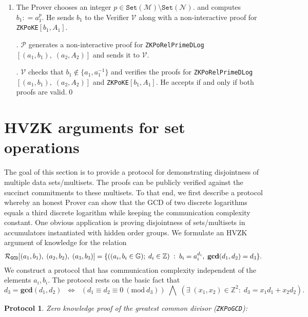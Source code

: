 \documentclass[11pt, lettersize, notitlepage, leqno, footskip=0.6cm]{article}
\newcommand{\bz}{\mathbb Z}
\newcommand{\ttt}{\texttt}
\newcommand{\sett}{\ttt{Set}}
\newcommand{\LRA}{\Longleftrightarrow}
\newcommand{\mc}{\mathcal}
\newcommand{\mb}{\mathbb}
\newcommand{\mbf}{\mathbf}
\newcommand{\mP}{\mc{P}}
\newcommand{\V}{\mc{V}}
\newcommand{\vs}{\vspace{-0.15cm}}
\newcommand{\noin}{\noindent}
\newcommand{\Mod}[1]{\ (\mathrm{mod}\ #1)}
\newcommand{\GCD}{\mbf{gcd}}
\newtheorem{Prot}[Thm]{Protocol}
\numberwithin{equation}{section}
\begin{document}
\begin{enumerate}[wide, labelwidth=!, labelindent=0pt] \vs \item The Prover chooses an integer $p\in \sett(\mc{M})\setminus \sett(\mc{N}).$ and computes $b_1: = a_1^p$. He sends $b_1$ to the Verifier $\V$ along with a non-interactive proof for \verb|ZKPoKE|$[b_1, A_1]$.

\noin 2. $\mP$ generates a non-interactive proof for \verb|ZKPoRelPrimeDLog|$[(a_1, b_1),\; (a_2, A_2)]$ and sends it to $\V$.

\noin 3. $\V$ checks that $b_1\notin \{ a_1, a_1^{-1}\}$ and verifies the proofs for \verb|ZKPoRelPrimeDLog|$[(a_1, b_1),\; (a_2, A_2)]$ and \verb|ZKPoKE|$[b_1, A_1]$. He accepts if and only if both proofs are valid.\qed \end{enumerate}









\section{\fontsize{12}{12}\selectfont HVZK arguments for set operations}

The goal of this section is to provide a protocol for demonstrating disjointness of multiple data sets/multisets. The proofs can be publicly verified against the succinct commitments to these multisets. To that end, we first describe a protocol whereby an honest Prover can show that the GCD of two discrete logarithms equals a third discrete logarithm while keeping the communication complexity constant. One obvious application is proving disjointness of sets/multisets in accumulators instantiated with hidden order groups. We formulate an HVZK argument of knowledge for the relation \vs  $$\mc{R}_{{\ttt{GCD}}}[(a_1,b_1),\;(a_2,b_2),\;(a_3,b_3)] = \{((a_i, b_i\in\mb{G});\;d_i\in\bz)\;:\; b_i = a_i^{d_i},\;\GCD(d_1,d_2)=d_3  \} . \vs $$ We construct a protocol that has communication complexity independent of the elements $a_i, b_i$. The protocol rests on the basic fact that \vs $$d_3 = \GCD(d_1, d_2)\;\; \LRA \;\;(d_1\equiv d_2\equiv 0 \Mod{d_3})\;\bigwedge \; \left(\exists \; (x_1,x_2)\in \bz^2:\; d_3 = x_1d_1+x_2d_2  \right).$$
 

\begin{Prot} \normalfont \hypertarget{GCD}{\textit{Zero knowledge proof of the greatest common divisor}} (\verb|ZKPoGCD|):\end{Prot} \vspace{-0.3cm}
\end{document}
